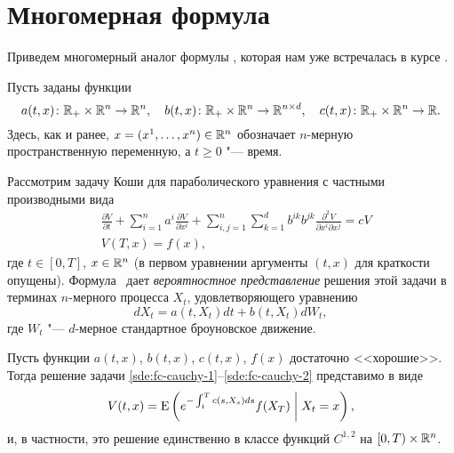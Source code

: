 \section{Многомерная формула \fc}

Приведем многомерный аналог формулы \fc, которая нам уже встречалась в курсе \intro.

Пусть заданы функции 
\[
a(t,x)\colon \mathbb{R}_+\times \mathbb{R}^n \to \mathbb{R}^n, \quad
b(t,x)\colon \mathbb{R}_+\times \mathbb{R}^n \to \mathbb{R}^{n\times d}, \quad
c(t,x)\colon \mathbb{R}_+\times \mathbb{R}^n \to \mathbb{R}.
\]
Здесь, как и ранее, $x=(x^1,\dots,x^n)\in\mathbb{R}^n$ обозначает $n$-мерную пространственную переменную, а $t\ge 0$ "--- время.

Рассмотрим задачу Коши для параболического уравнения с частными производными вида
\begin{align}
\label{sde:fc-cauchy-1}
&\frac{\partial V}{\partial t} + \sum_{i=1}^n a^i\frac{\partial V}{\partial x^i} + 
\sum_{i,j=1}^n\sum_{k=1}^d b^{ik}b^{jk}\frac{\partial^2 V}{\partial x^i \partial x^j}
= cV\\
\label{sde:fc-cauchy-2}
&V(T,x) = f(x),
\end{align}
где $t\in[0,T]$, $x\in\mathbb{R}^n$ (в первом уравнении аргументы $(t,x)$ для краткости опущены). 
Формула \fc\ дает \emph{вероятностное представление} решения этой задачи в терминах $n$-мерного процесса $X_t$, удовлетворяющего уравнению 
\begin{equation}
\label{sde:fc-process}
dX_t = a(t,X_t) dt + b(t,X_t) dW_t,
\end{equation}
где $W_t$ "--- $d$-мерное стандартное броуновское движение.

\begin{theorem}
Пусть функции $a(t,x)$, $b(t,x)$, $c(t,x)$, $f(x)$ достаточно <<хорошие>>.
Тогда решение задачи  \eqref{sde:fc-cauchy-1}--\eqref{sde:fc-cauchy-2} представимо в виде
\begin{equation}
\label{sde:fc-v}
V(t,x) = \operatorname{E}\left(e^{-\int_t^T c(s,X_s)ds} f(X_T) \;\bigg|\; X_t = x\right),
\end{equation}
и, в частности, это решение единственно в классе функций $C^{1,2}$ на $[0,T)\times \mathbb{R}^n$.
\end{theorem}

